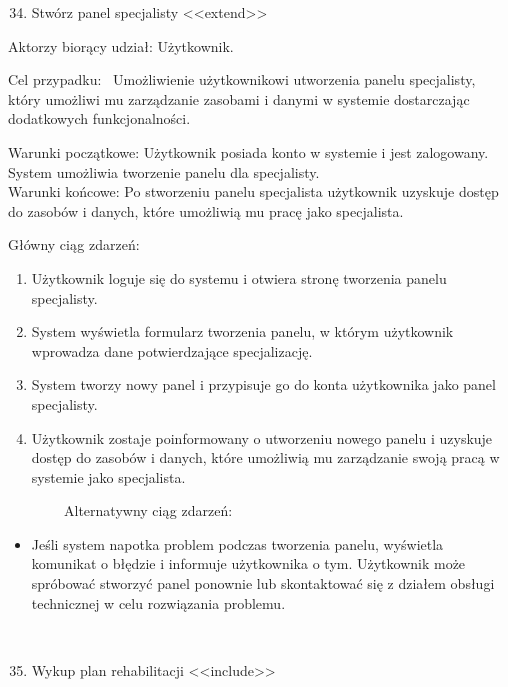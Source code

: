 \begin{enumerate}
\setcounter{enumi}{33}
\tightlist
\item
  {Stwórz panel specjalisty
  \textless\textless extend\textgreater\textgreater{}}
\end{enumerate}

{Aktorzy biorący udział: Użytkownik.}

{Cel przypadku: ~Umożliwienie użytkownikowi utworzenia panelu
specjalisty, który umożliwi mu zarządzanie zasobami i danymi w systemie
dostarczając dodatkowych funkcjonalności.}

{Warunki początkowe: Użytkownik posiada konto w systemie i jest
zalogowany. System umożliwia tworzenie panelu dla specjalisty.\\
Warunki końcowe: Po stworzeniu panelu specjalista użytkownik uzyskuje
dostęp do zasobów i danych, które umożliwią mu pracę jako specjalista.}

{Główny ciąg zdarzeń:}

\begin{enumerate}
\tightlist
\item
  {Użytkownik loguje się do systemu i otwiera stronę tworzenia panelu
  specjalisty.}
\item
  {System wyświetla formularz tworzenia panelu, w którym użytkownik
  wprowadza dane potwierdzające specjalizację.}
\item
  {System tworzy nowy panel i przypisuje go do konta użytkownika jako
  panel specjalisty.}
\item
  {Użytkownik zostaje poinformowany o utworzeniu nowego panelu i
  uzyskuje dostęp do zasobów i danych, które umożliwią mu zarządzanie
  swoją pracą w systemie jako specjalista.}
\end{enumerate}

{~~~~~~~~Alternatywny ciąg zdarzeń:}

\begin{itemize}
\tightlist
\item
  {Jeśli system napotka problem podczas tworzenia panelu, wyświetla
  komunikat o błędzie i informuje użytkownika o tym. Użytkownik może
  spróbować stworzyć panel ponownie lub skontaktować się z działem
  obsługi technicznej w celu rozwiązania problemu.\\
  \strut \\
  }
\end{itemize}

\begin{enumerate}
\setcounter{enumi}{34}
\tightlist
\item
  {Wykup plan rehabilitacji
  \textless\textless include\textgreater\textgreater{}}
\end{enumerate}

